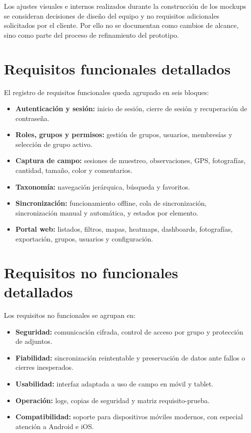 Los ajustes visuales e internos realizados durante la construcción de los mockups
se consideran decisiones de diseño del equipo y no requisitos adicionales
solicitados por el cliente. Por ello no se documentan como cambios de alcance, sino
como parte del proceso de refinamiento del prototipo.

\section{Requisitos funcionales detallados}

El registro de requisitos funcionales queda agrupado en seis bloques:

\begin{itemize}
  \item \textbf{Autenticación y sesión:} inicio de sesión, cierre de sesión y
    recuperación de contraseña.
  \item \textbf{Roles, grupos y permisos:} gestión de grupos, usuarios, membresías y
    selección de grupo activo.
  \item \textbf{Captura de campo:} sesiones de muestreo, observaciones, GPS,
    fotografías, cantidad, tamaño, color y comentarios.
  \item \textbf{Taxonomía:} navegación jerárquica, búsqueda y favoritos.
  \item \textbf{Sincronización:} funcionamiento offline, cola de sincronización,
    sincronización manual y automática, y estados por elemento.
  \item \textbf{Portal web:} listados, filtros, mapas, heatmaps, dashboards,
    fotografías, exportación, grupos, usuarios y configuración.
\end{itemize}

\section{Requisitos no funcionales detallados}

Los requisitos no funcionales se agrupan en:

\begin{itemize}
  \item \textbf{Seguridad:} comunicación cifrada, control de acceso por grupo y
    protección de adjuntos.
  \item \textbf{Fiabilidad:} sincronización reintentable y preservación de datos ante
    fallos o cierres inesperados.
  \item \textbf{Usabilidad:} interfaz adaptada a uso de campo en móvil y tablet.
  \item \textbf{Operación:} logs, copias de seguridad y matriz requisito-prueba.
  \item \textbf{Compatibilidad:} soporte para dispositivos móviles modernos, con
    especial atención a Android e iOS.
\end{itemize}

